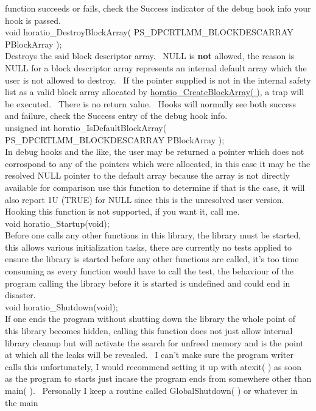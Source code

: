\documentclass{article}
\begin{document}
function
succeeds or fails, check the Success indicator of the debug hook info
your
hook is passed.
\\
void horatio\_DestroyBlockArray(
PS\_DPCRTLMM\_BLOCKDESCARRAY
PBlockArray );
\\
Destroys the said block descriptor array.~ NULL is \textbf{not}
allowed, the reason is NULL for a block descriptor array represents an
internal default array which the user is not allowed to destroy.~
If the pointer supplied is not in the internal safety list as a valid
block
array allocated by \href{#CreateBlockArray}{horatio\_CreateBlockArray(
)}, a trap will be executed.~ There is no return value.~
Hooks
will normally see both success and failure, check the Success entry of
the debug hook info.
\\
unsigned int horatio\_IsDefaultBlockArray(
PS\_DPCRTLMM\_BLOCKDESCARRAY
PBlockArray );
\\
In debug hooks and the like, the user may be returned a pointer which
does not corrospond to any of the pointers which were allocated, in
this
case it may be the resolved NULL pointer to the default array because
the
array is not directly available for comparison use this function to
determine
if that is the case, it will also report 1U (TRUE) for NULL since this
is the unresolved user version.~ Hooking this function is not
supported,
if you want it, call me.
\\
void horatio\_Startup(void);
\\
Before one calls any other functions in this library, the library must
be started, this allows various initialization tasks, there are
currently
no tests applied to ensure the library is started before any other
functions
are called, it's too time consuming as every function would have to
call
the test, the behaviour of the program calling the library before it is
started is undefined and could end in disaster.
\\
void horatio\_Shutdown(void);
\\
If one ends the program without shutting down the library the whole
point of this library becomes hidden, calling this function does not
just
allow internal library cleanup but will activate the search for unfreed
memory and is the point at which all the leaks will be revealed.~
I can't make sure the program writer calls this unfortunately, I would
recommend setting it up with atexit( ) as soon as the program to starts
just incase the program ends from somewhere other than main( ).~
Personally
I keep a routine called GlobalShutdown( ) or whatever in the main
\end{document}
